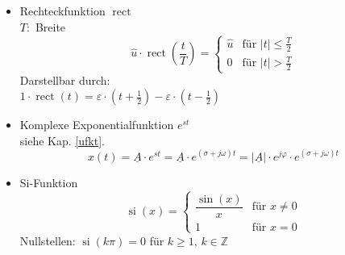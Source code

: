 \begin{mdframed}[style=exercise]
\begin{itemize}[leftmargin=*]
          \item{Rechteckfunktion $\operatorname{rect}$}\\
          $T:$ Breite
          \[ \hat{u} \cdot \operatorname{rect}\left(\frac{t}{T}\right) =
             \begin{cases}
                 \hat{u} & \text{f\"ur } \vert t\rvert \leq \frac{T}{2}\\
                 0 & \text{f\"ur } \vert t\rvert > \frac{T}{2}
             \end{cases}
          \]
          Darstellbar durch:\\ $1\cdot  \operatorname{rect}(t) = \varepsilon\cdot\left( t+\frac{1}{2} \right)-\varepsilon\cdot\left( t-\frac{1}{2} \right)$
          \item{Komplexe Exponentialfunktion $e^{st}$}\\
          siehe Kap. \ref{ufkt}.
          \[ x(t)=\underline{A}\cdot e^{st} = \underline{A}\cdot e^{(\sigma+j\omega)t} = |\underline{A}|\cdot e^{j\varphi} \cdot e^{(\sigma+j\omega)t}
          \]
          \item Si-Funktion
                    \[ \operatorname{si}(x) =
          \begin{cases}
          	\dfrac{\sin(x)}{x} & \text{f\"ur } x\neq 0\\
          	1 & \text{f\"ur } x = 0
          \end{cases}
          \]
          Nullstellen: $\operatorname{si}(k\pi)=0$ für $k\ge1,\, k\in \mathbb{Z}$
      \end{itemize}
  \end{mdframed}
